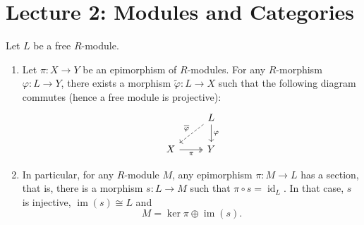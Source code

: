 \documentclass[11pt, a4paper]{report}
\begin{document}
\chapter{Lecture 2: Modules and Categories}

\begin{proposition}
Let $L$ be a free $R$-module.
\begin{enumerate}
\item Let $\pi: X \rightarrow Y$ be an epimorphism of $R$-modules. For any $R$-morphism $\varphi: L \rightarrow Y$, there exists a morphism $\tilde{\varphi}: L \rightarrow X$ such that the following diagram commutes (hence a free module is projective):
\[
\begin{tikzcd}
                               & L \arrow[d, "\varphi"] \arrow[ld, "\overline{\varphi}"', dashed] \\
X \arrow[r, "\pi"', two heads] & Y                                                               
\end{tikzcd}
\]
\item In particular, for any $R$-module $M$, any epimorphism $\pi: M \rightarrow L$ has a section, that is, there is a morphism $s: L \rightarrow M$ such that $\pi \circ s = \operatorname{id}_L$. In that case, $s$ is injective, $\operatorname{im}(s) \cong L$ and
\[
M = \ker \pi \oplus \operatorname{im}(s).
\]
\end{enumerate}
\end{proposition}
\end{document}
